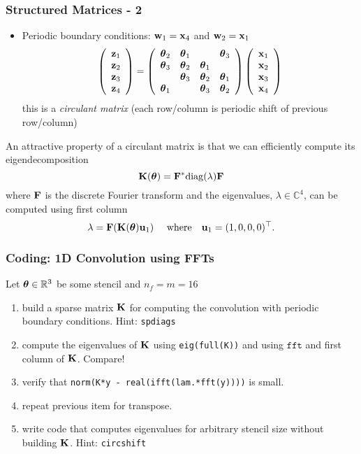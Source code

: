 \documentclass[12pt,fleqn,handout]{beamer}
\begin{document}
\begin{frame}
	\frametitle{Structured Matrices - 2}
	\begin{itemize}
		\item Periodic boundary conditions: ${\bf w}_1 = {\bf x}_4$ and ${\bf w}_2 = {\bf x}_1$
	$$
		\left( 
		\begin{array}{r}
			{\bf z}_1\\
			{\bf z}_2\\
			{\bf z}_3\\
			{\bf z}_4
		\end{array}
		\right)
		=
		\left( 
		\begin{array}{rrrr}
			        {\boldsymbol \theta}_2 & {\boldsymbol \theta}_1 &          & {\boldsymbol \theta}_3  \\
			        {\boldsymbol \theta}_3 & {\boldsymbol \theta}_2 & {\boldsymbol \theta}_1 &           \\
			                 & {\boldsymbol \theta}_3 & {\boldsymbol \theta}_2 & {\boldsymbol \theta}_1  \\
			        {\boldsymbol \theta}_1 &          & {\boldsymbol \theta}_3 & {\boldsymbol \theta}_2  \\
		\end{array}
		\right)
		\left( 
		\begin{array}{r}
			{\bf x}_1\\
			{\bf x}_2\\
			{\bf x}_3\\
			{\bf x}_4\\
		\end{array}
		\right)
	$$
	this is a \emph{circulant matrix} (each row/column is periodic shift of previous row/column)
	\end{itemize}
	\pause
	
	An attractive property of a circulant matrix is that we can efficiently compute its eigendecomposition
	$$
		{\bf K}({\boldsymbol \theta}) = {\bf F}^* {\rm diag}(\lambda) {\bf F}
	$$ 
	where ${\bf F}$ is the discrete Fourier transform and the eigenvalues, $\lambda \in {\mathbb{C}}^4$, can be computed using first column
	$$
		\lambda =   {\bf F}( {\bf K}({\boldsymbol \theta}) {\bf u}_1) \quad \text{ where} \quad {\bf u}_1 = (1,0,0,0)^\top.
	$$ 	
\end{frame}

\begin{frame}\frametitle{Coding: 1D Convolution using FFTs}
	Let ${\boldsymbol \theta} \in \mathbb{R}^3$ be some stencil and $n_f = m = 16$ 
\begin{enumerate}
	\item build a sparse matrix ${\bf K}$ for computing the convolution with periodic boundary conditions. 
	Hint: \texttt{spdiags}
	
	\item compute the eigenvalues of ${\bf K}$ using \texttt{eig(full(K))} and using $\texttt{fft}$ and first column of ${\bf K}$. Compare!
	
	\item verify that \texttt{norm(K*y - real(ifft(lam.*fft(y))))} is small.
	
	\item repeat previous item for transpose.
	
	\item write code that computes eigenvalues for arbitrary stencil size without building ${\bf K}$. Hint: \texttt{circshift}
\end{enumerate}
\end{frame}
\end{document}
